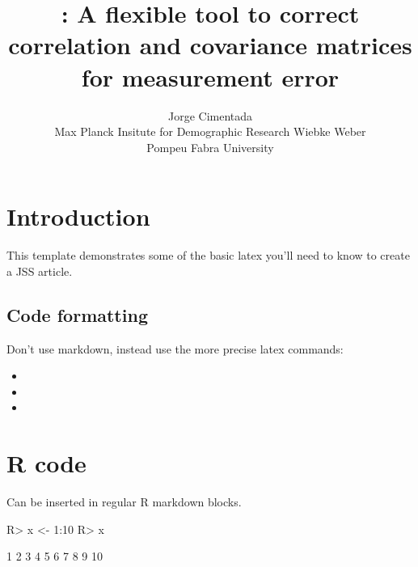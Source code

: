 \documentclass[
]{jss}
\author{
Jorge Cimentada\\Max Planck Insitute for Demographic Research \And Wiebke Weber\\Pompeu Fabra University
}
\title{\pkg{measurementerror}: A flexible tool to correct correlation and
covariance matrices for measurement error}
\begin{document}
\hypertarget{introduction}{%
\section{Introduction}\label{introduction}}

This template demonstrates some of the basic latex you'll need to know
to create a JSS article.

\hypertarget{code-formatting}{%
\subsection{Code formatting}\label{code-formatting}}

Don't use markdown, instead use the more precise latex commands:

\begin{itemize}
\item
\item
\item
\end{itemize}

\hypertarget{r-code}{%
\section{R code}\label{r-code}}

Can be inserted in regular R markdown blocks.

\begin{CodeChunk}

\begin{CodeInput}
R> x <- 1:10
R> x
\end{CodeInput}

\begin{CodeOutput}
 [1]  1  2  3  4  5  6  7  8  9 10
\end{CodeOutput}
\end{CodeChunk}
\end{document}
